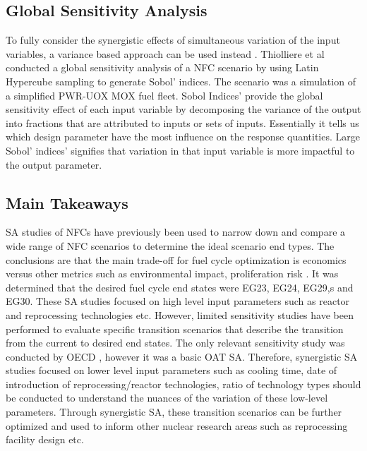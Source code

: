 \subsection{Global Sensitivity Analysis}
To fully consider the synergistic effects of
simultaneous variation of the input variables, a variance 
based approach can be used instead \cite{thiolliere_methodology_2018}.
Thiolliere et al conducted a global sensitivity analysis of a 
\gls{NFC} scenario by using Latin Hypercube sampling 
to generate Sobol' indices. 
The scenario was a simulation of a simplified PWR-UOX MOX fuel 
fleet. 
Sobol Indices' provide the global sensitivity effect of each input 
variable by decomposing the variance of the output into fractions 
that are attributed to inputs or sets of inputs. 
Essentially it tells us which design parameter have the most 
influence on the response quantities. 
Large Sobol' indices' signifies that variation in that 
input variable is more impactful to the output parameter. 

\subsection{Main Takeaways}
\gls{SA} studies of \glspl{NFC} have previously been used to narrow 
down and compare a wide range of \gls{NFC} scenarios to determine 
the ideal scenario end types. 
The conclusions are that the main trade-off for fuel cycle 
optimization is economics 
versus other metrics such as environmental impact, proliferation 
risk \cite{passerini_systematic_2014}.
It was determined that the desired fuel cycle end states 
were EG23, EG24, EG29,s and EG30.
These \gls{SA} studies focused on high level input 
parameters such as reactor and reprocessing technologies etc.
However, limited sensitivity studies have been performed to 
evaluate specific transition scenarios that describe the transition 
from the current to desired end states.
The only relevant sensitivity study was conducted by OECD 
\cite{noauthor_effects_2017}, however it was a basic OAT 
\gls{SA}.   
Therefore, synergistic \gls{SA} studies focused on
lower level input parameters such as cooling time, 
date of introduction of reprocessing/reactor 
technologies, ratio of technology types should be conducted to 
understand the nuances of the variation of these low-level parameters. 
Through synergistic \gls{SA}, these transition scenarios can be 
further optimized and used to inform other nuclear research areas 
such as reprocessing facility design etc. 
